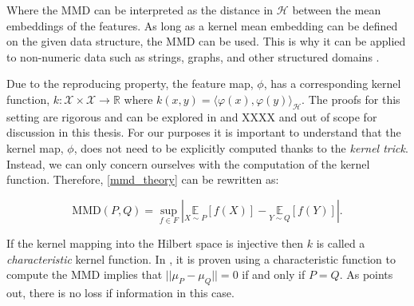 Where the MMD can be interpreted as the distance in $\mathcal{H}$ between the mean embeddings of the features. As long as a kernel mean embedding can be defined on the given data structure, the MMD can be used. This is why it can be applied to non-numeric data such as strings, graphs, and other structured domains \cite{hofmann2008kernel}. 

Due to the reproducing property, the feature map, $\phi$, has a corresponding kernel function, $k: \mathcal{X} \times \mathcal{X} \to \mathbb{R}$ where $k(x, y)=\langle\varphi(x), \varphi(y)\rangle_{\mathcal{H}}$. The proofs for this setting are rigorous and can be explored in \cite{smola2007hilbert} and XXXX and out of scope for discussion in this thesis. For our purposes it is important to understand that the kernel map, $\phi$, does not need to be explicitly computed thanks to the \textit{kernel trick}. Instead, we can only concern ourselves with the computation of the kernel function. Therefore, \ref{mmd_theory} can be rewritten as:

\begin{equation}
\text{MMD}(P,Q)=\sup _{f \in F}|\underset{X \sim P}{\mathbb{E}}[f(X)]-\underset{Y \sim Q}{\mathbb{E}}[f(Y)]|.
\end{equation}

If the kernel mapping into the Hilbert space is injective then $k$ is called a \textit{characteristic} kernel function. In  \cite{fukumizu2008kernel}, it is proven using a characteristic function to compute the MMD implies that $||\mu_P - \mu_Q ||=0$ if and only if $P=Q$.  As \cite{muandet2017kernel} points out, there is no loss if information in this case. 






